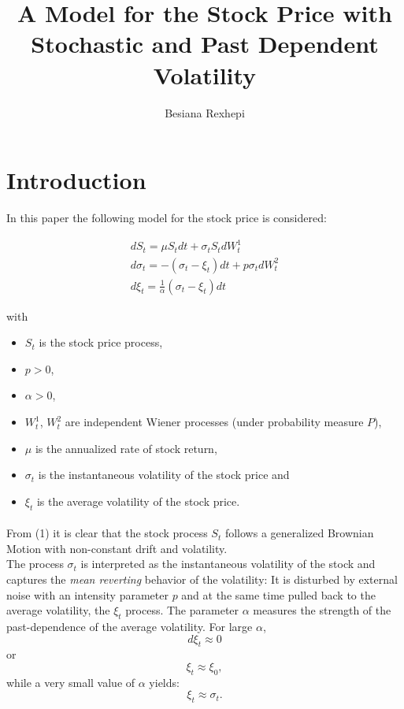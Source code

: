 \documentclass[11pt]{article}
\title{A Model for the Stock Price with Stochastic and Past Dependent Volatility}
\author{Besiana Rexhepi}
\begin{document}
\maketitle

\section{Introduction}
In this paper the following model for the stock price is considered:

\begin{eqnarray}
\nonumber
dS_t = \mu  S_t  dt + \sigma_t  S_t  dW_t^1\\
d\sigma_t = -(\sigma_t - \xi_t) dt + p \sigma_t dW_t^2\\
\nonumber
d\xi_t = \frac{1}{\alpha} (\sigma_t - \xi_t) dt
\end{eqnarray}

with 
\begin{itemize}
\item
$S_t$ is the stock price process,
\item
$p > 0$,
\item
$\alpha > 0$,
\item
$W_t^1$, $W_t^2$ are independent Wiener processes (under probability measure $P$),
\item
 $\mu$ is the annualized rate of stock return,
\item
 $\sigma_t$ is the instantaneous volatility of the stock price and
 \item 
 $\xi_t$ is the average volatility of the stock price.
\end{itemize}
\paragraph{}
From (1) it is clear that the stock process $S_t$ follows a generalized
Brownian Motion with non-constant drift and volatility.\\
The process $\sigma_t$ is interpreted as the instantaneous volatility of the stock and captures the \textit{mean reverting} behavior of the volatility: It is disturbed by external noise with an intensity parameter $p$ and at the same time pulled back to the average volatility, the $\xi_t$ process.
\newline
The parameter $\alpha$ measures the strength of the past-dependence of the average volatility.
\newline
For large $\alpha$, 
\begin{equation}
d\xi_t \approx 0
\end{equation} or
\begin{equation}
\xi_t \approx \xi_0,
\end{equation}
while a very small value of $\alpha$ yields:
\begin{equation}
\xi_t \approx \sigma_t.
\end{equation}
\end{document}

